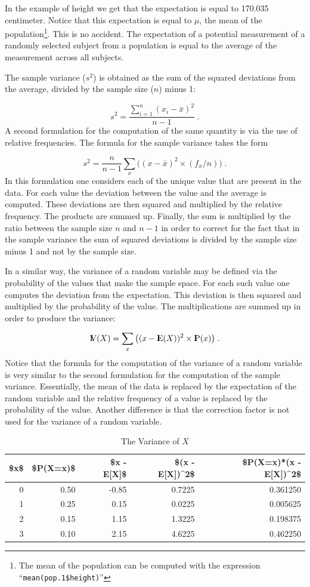 \documentclass[]{krantz}
\newcommand{\Expec}{{\rm I\kern-.3em E}}
\newcommand{\Prob}{{\rm I\kern-.3em P}}
\newcommand{\Var}{{\rm I\kern-.3em V}}
\theoremstyle{definition}
\theoremstyle{definition}
\theoremstyle{definition}
\theoremstyle{remark}
\begin{document}
In the example of height we get that the expectation is equal to 170.035
centimeter. Notice that this expectation is equal to \(\mu\), the mean of
the population\footnote{The mean of the population can be computed with the expression
  ``\texttt{mean(pop.1\$height)}''}. This is no accident. The expectation of a potential
measurement of a randomly selected subject from a population is equal to
the average of the measurement across all subjects.

The sample variance (\(s^2\)) is obtained as the sum of the squared
deviations from the average, divided by the sample size (\(n\)) minus 1:

\[s^2 = \frac{\sum_{i=1}^n (x_i - \bar x)^2}{n-1}\;.\] A second
formulation for the computation of the same quantity is via the use of
relative frequencies. The formula for the sample variance takes the form

\[s^2 = \frac{n}{n-1}\sum_x \big((x - \bar x)^2\times (f_x/n)\big)\;.\]
In this formulation one considers each of the unique value that are
present in the data. For each value the deviation between the value and
the average is computed. These deviations are then squared and
multiplied by the relative frequency. The products are summed up.
Finally, the sum is multiplied by the ratio between the sample size \(n\)
and \(n-1\) in order to correct for the fact that in the sample variance
the sum of squared deviations is divided by the sample size minus 1 and
not by the sample size.

In a similar way, the variance of a random variable may be defined via
the probability of the values that make the sample space. For each such
value one computes the deviation from the expectation. This deviation is
then squared and multiplied by the probability of the value. The
multiplications are summed up in order to produce the variance:

\[\Var(X) = \sum_x\big( (x-\Expec(X))^2 \times \Prob(x)\big)\;.\] Notice
that the formula for the computation of the variance of a random
variable is very similar to the second formulation for the computation
of the sample variance. Essentially, the mean of the data is replaced by
the expectation of the random variable and the relative frequency of a
value is replaced by the probability of the value. Another difference is
that the correction factor is not used for the variance of a random
variable.

\begin{table}[t]

\caption{\label{tab:tab3}The Variance of $X$}
\centering
\begin{tabular}{rrrrr}
\toprule
\$x\$ & \$P(X=x)\$ & \$x - E[X]\$ & \$(x - E[X])\textasciicircum{}2\$ & \$P(X=x)*(x - E[X])\textasciicircum{}2\$\\
\midrule
0 & 0.50 & -0.85 & 0.7225 & 0.361250\\
1 & 0.25 & 0.15 & 0.0225 & 0.005625\\
2 & 0.15 & 1.15 & 1.3225 & 0.198375\\
3 & 0.10 & 2.15 & 4.6225 & 0.462250\\
\bottomrule
\end{tabular}
\end{table}
\end{document}
